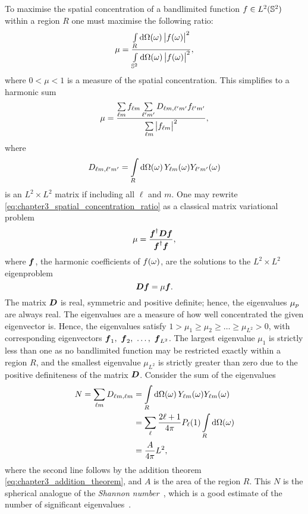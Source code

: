 To maximise the spatial concentration of a bandlimited function \(f \in \hilbert{\twoSphere}\) within a region \(R\) one must maximise the following ratio:
%
\begin{equation}
	\mu
	= \frac{\integrateRegion{\omega} \abs{\pixel{f}}^{2}}{\integrateSphere{\omega} \abs{\pixel{f}}^{2}},
\end{equation}
%
where \(0 < \mu < 1\) is a measure of the spatial concentration.
This simplifies to a harmonic sum
%
\begin{equation}\label{eq:chapter3_spatial_concentration_ratio}
	\mu
	= \frac{\harmonicSum \harmonic{f} \harmonicSum['] \Dmatrix \harmonic[']{f}}{\harmonicSum \abs{\harmonic{f}}^{2}},
\end{equation}
%
where
%
\begin{equation}
	\Dmatrix
	= \integrateRegion{\omega} \pixel{\harmonic{Y}} \pixel{\harmonic[']{Y}}
\end{equation}
%
is an \(L^{2} \times{} L^{2}\) matrix if including all \(\ell{}\) and \(m\).
One may rewrite \cref{eq:chapter3_spatial_concentration_ratio} as a classical matrix variational problem
%
\begin{equation}
	\mu
	= \frac{\vb*{f}^{\dagger} \vb*{D} \vb*{f}}{\vb*{f}^{\dagger}\vb*{f}},
\end{equation}
%
where \(\vb*{f}\), the harmonic coefficients of \(\pixel{f}\), are the solutions to the \(L^{2} \times{} L^{2}\) eigenproblem
%
\begin{equation}\label{eq:chapter3_eigenproblem}
	\vb*{D}\vb*{f}
	= \mu\vb*{f}.
\end{equation}
%
The matrix \(\vb*{D}\) is real, symmetric and positive definite; hence, the eigenvalues \(\slepian{\mu}\) are always real.
The eigenvalues are a measure of how well concentrated the given eigenvector is.
Hence, the eigenvalues satisfy \(1 > \mu_{1} \geq \mu_{2} \geq \ldots \geq \mu_{L^{2}} > 0\), with corresponding eigenvectors \(\vb*{f}_{1},\ \vb*{f}_{2},\ \ldots,\ \vb*{f}_{L^{2}}\). %
The largest eigenvalue \(\mu_{1}\) is strictly less than one as no bandlimited function may be restricted exactly within a region \(R\), and the smallest eigenvalue \(\mu_{L^{2}}\) is strictly greater than zero due to the positive definiteness of the matrix \(\vb*{D}\).
Consider the sum of the eigenvalues
%
\begin{align}\label{eq:chapter3_shannon}
	N
	= \harmonicSum D_{\ell m,\ell m}
	 & = \integrateRegion{\omega} \pixel{\harmonic{Y}} \pixel{\harmonic{Y}} \nonumber \\
	 & = \sum\limits_{\ell} \factor P_{\ell}(1) \integrateRegion{\omega} \nonumber    \\
	 & = \frac{A}{4\pi} L^{2},
\end{align}
%
where the second line follows by the addition theorem \cref{eq:chapter3_addition_theorem}, and \(A\) is the area of the region \(R\).
This \(N\) is the spherical analogue of the \emph{Shannon number}~\cite{Simons2006}, which is a good estimate of the number of significant eigenvalues~\cite{Donoho1989}.

